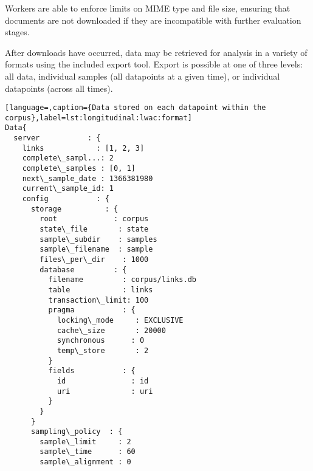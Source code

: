 Workers are able to enforce limits on MIME type and file size, ensuring that documents are not downloaded if they are incompatible with further evaluation stages.

After downloads have occurred, data may be retrieved for analysis in a variety of formats using the included export tool.  Export is possible at one of three levels: all data, individual samples (all datapoints at a given time), or individual datapoints (across all times).


\begin{lstlisting}[language=,caption={Data stored on each datapoint within the corpus},label=lst:longitudinal:lwac:format]
Data{
  server           : {
    links            : [1, 2, 3]                                         
    complete\_sampl...: 2                                                 
    complete\_samples : [0, 1]                                            
    next\_sample_date : 1366381980                                        
    current\_sample_id: 1                                                 
    config           : {
      storage          : {
        root             : corpus                                            
        state\_file       : state                                             
        sample\_subdir    : samples                                           
        sample\_filename  : sample                                            
        files\_per\_dir    : 1000                                              
        database         : {
          filename         : corpus/links.db                                   
          table            : links                                             
          transaction\_limit: 100                                               
          pragma           : {
            locking\_mode     : EXCLUSIVE                                         
            cache\_size       : 20000                                             
            synchronous      : 0                                                 
            temp\_store       : 2                                                 
          }
          fields           : {
            id               : id                                                
            uri              : uri                                               
          }
        }
      }
      sampling\_policy  : {
        sample\_limit     : 2                                                 
        sample\_time      : 60                                                
        sample\_alignment : 0                                                 

\end{lstlisting}
